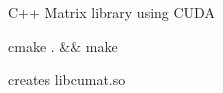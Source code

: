 C++ Matrix library using C\+U\+DA


\begin{DoxyCode}
cmake . \&\& make
\end{DoxyCode}
 creates libcumat.\+so 